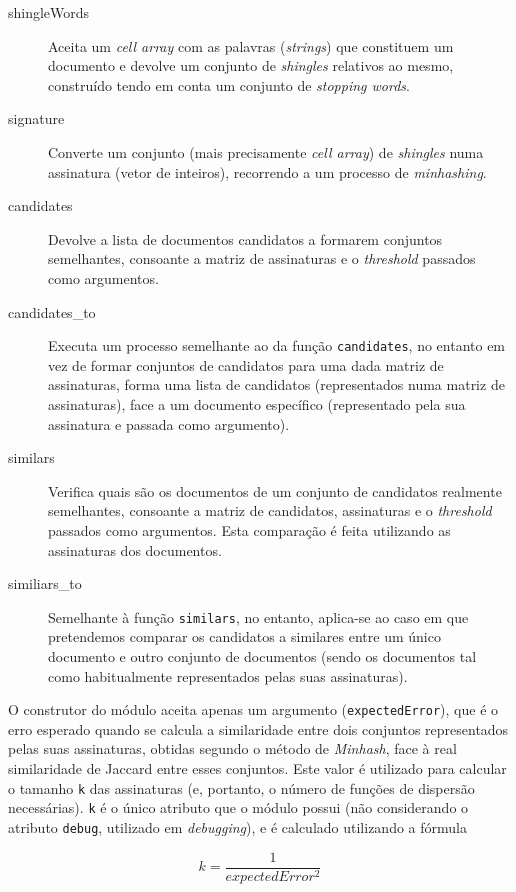\documentclass[a4paper,11pt,openright,oneside]{report}
\begin{document}
\begin{description}
\item[shingleWords]
Aceita um \textit{cell array} com as palavras (\textit{strings}) que constituem um documento e devolve um conjunto de \textit{shingles} relativos ao mesmo, construído tendo em conta um conjunto de \textit{stopping words}.
\item[signature]
Converte um conjunto (mais precisamente \textit{cell array}) de \textit{shingles} numa assinatura (vetor de inteiros), recorrendo a um processo de \textit{minhashing}.
\item[candidates]
Devolve a lista de documentos candidatos a formarem conjuntos semelhantes, consoante a matriz de assinaturas e o \textit{threshold} passados como argumentos.
\item[candidates\_to]
Executa um processo semelhante ao da função \texttt{candidates}, no entanto em vez de formar conjuntos de candidatos para uma dada matriz de assinaturas, forma uma lista de candidatos (representados numa matriz de assinaturas), face a um documento específico (representado pela sua assinatura e passada como argumento).
\item[similars]
Verifica quais são os documentos de um conjunto de candidatos realmente semelhantes, consoante a matriz de candidatos, assinaturas e o \textit{threshold} passados como argumentos. Esta comparação é feita utilizando as assinaturas dos documentos.
\item[similiars\_to]
Semelhante à função \texttt{similars}, no entanto, aplica-se ao caso em que pretendemos comparar os candidatos a similares entre um único documento e outro conjunto de documentos (sendo os documentos tal como habitualmente representados pelas suas assinaturas).
\end{description}

O construtor do módulo aceita apenas um argumento (\texttt{expectedError}), que é o erro esperado quando se calcula a similaridade entre dois conjuntos representados pelas suas assinaturas, obtidas segundo o método de \textit{Minhash}, face à real similaridade de Jaccard entre esses conjuntos. Este valor é utilizado para calcular o tamanho \texttt{k} das assinaturas (e, portanto, o número de funções de dispersão necessárias). \texttt{k} é o único atributo que o módulo possui (não considerando o atributo \texttt{debug}, utilizado em \textit{debugging}), e é calculado utilizando a fórmula

$$ k = \frac{1}{expectedError^2} $$
\end{document}
